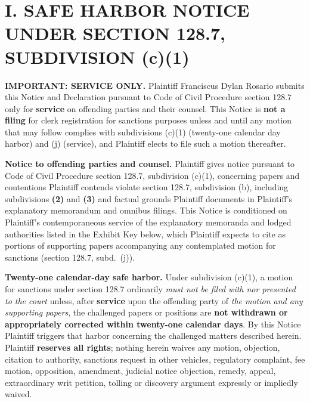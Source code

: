 \newcommand{\docshorttitle}{SAFE HARBOR + DECL.\ --- CCP \textsection 128.7(c)(1) (CGC-25-631802)}
\newcommand{\doctitleblock}{NOTICE UNDER CODE OF CIVIL PROCEDURE SECTION 128.7, SUBDIVISION (c)(1), AND DECLARATION OF PLAINTIFF}
\newcommand{\docsubblock}{(Serve on defendants and defense counsel identified on the preceding caption; \textbf{not for filing with the Clerk} until subdiv.\ (c)(1) prerequisites are satisfied absent withdrawal/correction of challenged papers)}




\section*{I. SAFE HARBOR NOTICE UNDER SECTION 128.7, SUBDIVISION (c)(1)}

\textbf{IMPORTANT: SERVICE ONLY.} Plaintiff Franciscus Dylan Rosario submits this Notice and Declaration pursuant to Code of Civil Procedure section 128.7 only for \textbf{service} on offending parties and their counsel. This Notice is \textbf{not a filing} for clerk registration for sanctions purposes unless and until any motion that may follow complies with subdivisions (c)(1) (twenty-one calendar day harbor) and (j) (service), and Plaintiff elects to file such a motion thereafter.

\textbf{Notice to offending parties and counsel.} Plaintiff gives notice pursuant to Code of Civil Procedure section 128.7, subdivision (c)(1), concerning papers and contentions Plaintiff contends violate section 128.7, subdivision (b), including subdivisions \textbf{(2)} and \textbf{(3)} and factual grounds Plaintiff documents in Plaintiff's explanatory memorandum and omnibus filings. This Notice is conditioned on Plaintiff's contemporaneous service of the explanatory memoranda and lodged authorities listed in the Exhibit Key below, which Plaintiff expects to cite as portions of supporting papers accompanying any contemplated motion for sanctions (section 128.7, subd.\ (j)).

\textbf{Twenty-one calendar-day safe harbor.} Under subdivision (c)(1), a motion for sanctions under section 128.7 ordinarily \textit{must not be filed with nor presented to the court} unless, after \textbf{service} upon the offending party of \textit{the motion and any supporting papers}, the challenged papers or positions are \textbf{not withdrawn or appropriately corrected within twenty-one calendar days}. By this Notice Plaintiff triggers that harbor concerning the challenged matters described herein. Plaintiff \textbf{reserves all rights}; nothing herein waives any motion, objection, citation to authority, sanctions request in other vehicles, regulatory complaint, fee motion, opposition, amendment, judicial notice objection, remedy, appeal, extraordinary writ petition, tolling or discovery argument expressly or impliedly waived.

